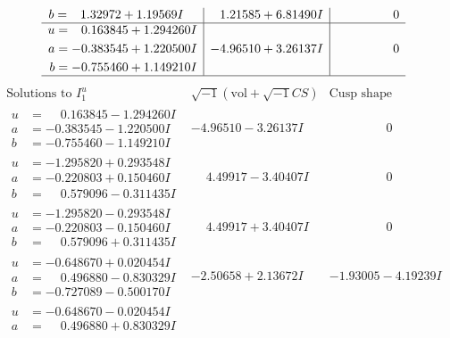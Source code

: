 \documentclass[1p]{elsarticle_modified}
\theoremstyle{definition}
\newcommand{\I}{\sqrt{-1}}
\begin{document}
$$\begin{array}{c|c|c}
\begin{aligned}
b &= \phantom{-}1.32972 + 1.19569 I\end{aligned}
 & \phantom{-}1.21585 + 6.81490 I & \phantom{-0.000000 } 0 \\ \hline\begin{aligned}
u &= \phantom{-}0.163845 + 1.294260 I \\
a &= -0.383545 + 1.220500 I \\
b &= -0.755460 + 1.149210 I\end{aligned}
 & -4.96510 + 3.26137 I & \phantom{-0.000000 } 0\\
 \hline 
 \end{array}$$\newpage$$\begin{array}{c|c|c}  
\text{Solutions to }I^u_{1}& \I (\text{vol} + \sqrt{-1}CS) & \text{Cusp shape}\\
 \hline 
\begin{aligned}
u &= \phantom{-}0.163845 - 1.294260 I \\
a &= -0.383545 - 1.220500 I \\
b &= -0.755460 - 1.149210 I\end{aligned}
 & -4.96510 - 3.26137 I & \phantom{-0.000000 } 0 \\ \hline\begin{aligned}
u &= -1.295820 + 0.293548 I \\
a &= -0.220803 + 0.150460 I \\
b &= \phantom{-}0.579096 - 0.311435 I\end{aligned}
 & \phantom{-}4.49917 - 3.40407 I & \phantom{-0.000000 } 0 \\ \hline\begin{aligned}
u &= -1.295820 - 0.293548 I \\
a &= -0.220803 - 0.150460 I \\
b &= \phantom{-}0.579096 + 0.311435 I\end{aligned}
 & \phantom{-}4.49917 + 3.40407 I & \phantom{-0.000000 } 0 \\ \hline\begin{aligned}
u &= -0.648670 + 0.020454 I \\
a &= \phantom{-}0.496880 - 0.830329 I \\
b &= -0.727089 - 0.500170 I\end{aligned}
 & -2.50658 + 2.13672 I & -1.93005 - 4.19239 I \\ \hline\begin{aligned}
u &= -0.648670 - 0.020454 I \\
a &= \phantom{-}0.496880 + 0.830329 I \\

\end{aligned}
\end{array}$$
\end{document}
